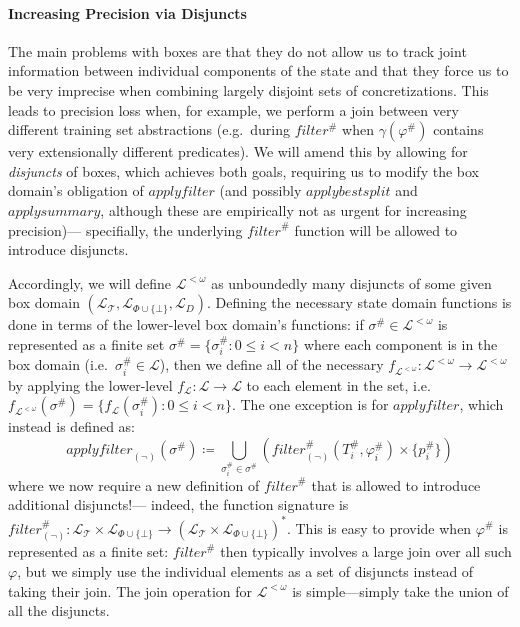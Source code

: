 \paragraph{Increasing Precision via Disjuncts}
The main problems with boxes are
\rone that they do not allow us to track joint information
between individual components of the state and
\rtwo that they force us to be very imprecise when combining
largely disjoint sets of concretizations.
This leads to precision loss when, for example,
we perform a join between very different training set abstractions
(e.g.\ during $\mathit{filter^\#}$ when $\gamma(\varphi^\#)$
contains very extensionally different predicates).
We will amend this by
\rone allowing for \emph{disjuncts} of boxes,
which achieves both goals, requiring us to
\rtwo modify the box domain's obligation of $\mathit{applyfilter}$
(and possibly $\mathit{applybestsplit}$ and $\mathit{applysummary}$,
although these are empirically not as urgent for increasing precision)---%
specifially, the underlying $\mathit{filter}^\#$ function
will be allowed to introduce disjuncts.

Accordingly, we will define $\mathcal{L}^{<\omega}$ as
unboundedly many disjuncts of some given box domain
$(\mathcal{L}_\mathcal{T}, \mathcal{L}_{\Phi\cup\{\bot\}}, \mathcal{L}_D)$.
Defining the necessary state domain functions is done in terms of the
lower-level box domain's functions:
if $\sigma^\# \in \mathcal{L}^{<\omega}$ is represented as a finite set
$\sigma^\# = \{\sigma^\#_i : 0 \leq i < n\}$ where each component is in the box domain
(i.e.\ $\sigma^\#_i \in \mathcal{L}$),
then we define all of the necessary $f_{\mathcal{L}^{<\omega}} : \mathcal{L}^{<\omega} \rightarrow \mathcal{L}^{<\omega}$
by applying the lower-level $f_{\mathcal{L}} : \mathcal{L} \rightarrow \mathcal{L}$
to each element in the set,
i.e.\ $f_{\mathcal{L}^{<\omega}}(\sigma^\#) = \{f_{\mathcal{L}}(\sigma^\#_i) : 0 \leq i < n\}$.
The one exception is for $\mathit{applyfilter}$, which instead is defined as:
\[
    \mathit{applyfilter}_{(\lnot)}(\sigma^\#) \coloneqq
    \bigcup_{\sigma^\#_i \in \sigma^\#} (\mathit{filter}^\#_{(\lnot)}(T^\#_i, \varphi^\#_i) \times \{p^\#_i\})
\]
where we now require a new definition of $\mathit{filter}^\#$
that is allowed to introduce additional disjuncts!---%
indeed, the function signature is
$\mathit{filter}^\#_{(\lnot)} : \mathcal{L}_\mathcal{T} \times \mathcal{L}_{\Phi\cup\{\bot\}}
\rightarrow (\mathcal{L}_\mathcal{T} \times \mathcal{L}_{\Phi\cup\{\bot\}})^*$.
This is easy to provide when $\varphi^\#$ is represented as a finite set:
$\mathit{filter}^\#$ then typically involves a large join over all such $\varphi$,
but we simply use the individual elements as a set of disjuncts instead of taking their join.
The join operation for $\mathcal{L}^{<\omega}$ is simple---simply take the union of all the disjuncts.

